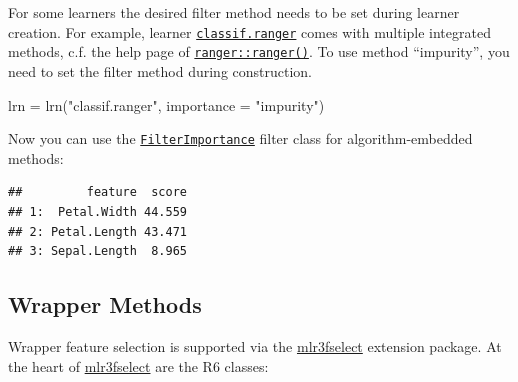 \documentclass[
]{scrbook}
\newenvironment{Shaded}{\begin{snugshade}}{\end{snugshade}}
\newcommand{\AttributeTok}[1]{\textcolor[rgb]{0.77,0.63,0.00}{#1}}
\newcommand{\DecValTok}[1]{\textcolor[rgb]{0.00,0.00,0.81}{#1}}
\newcommand{\FunctionTok}[1]{\textcolor[rgb]{0.00,0.00,0.00}{#1}}
\newcommand{\NormalTok}[1]{#1}
\newcommand{\OtherTok}[1]{\textcolor[rgb]{0.56,0.35,0.01}{#1}}
\newcommand{\SpecialCharTok}[1]{\textcolor[rgb]{0.00,0.00,0.00}{#1}}
\newcommand{\StringTok}[1]{\textcolor[rgb]{0.31,0.60,0.02}{#1}}
\renewenvironment{Shaded} {\begin{snugshade}\small} {\end{snugshade}}
\begin{document}
For some learners the desired filter method needs to be set during learner creation.
For example, learner \href{https://mlr3learners.mlr-org.com/reference/mlr_learners_classif.ranger.html}{\texttt{classif.ranger}} comes with multiple integrated methods, c.f. the help page of \href{https://www.rdocumentation.org/packages/ranger/topics/ranger}{\texttt{ranger::ranger()}}.
To use method ``impurity'', you need to set the filter method during construction.

\begin{Shaded}
\begin{Highlighting}[]
\NormalTok{lrn }\OtherTok{=} \FunctionTok{lrn}\NormalTok{(}\StringTok{"classif.ranger"}\NormalTok{, }\AttributeTok{importance =} \StringTok{"impurity"}\NormalTok{)}
\end{Highlighting}
\end{Shaded}

Now you can use the \href{https://mlr3filters.mlr-org.com/reference/mlr_filters_importance.html}{\texttt{FilterImportance}} filter class for algorithm-embedded methods:

\begin{Shaded}
\end{Shaded}

\begin{verbatim}
##         feature  score
## 1:  Petal.Width 44.559
## 2: Petal.Length 43.471
## 3: Sepal.Length  8.965
\end{verbatim}

\hypertarget{fs-wrapper}{%
\subsection{Wrapper Methods}\label{fs-wrapper}}

Wrapper feature selection is supported via the \href{https://mlr3fselect.mlr-org.com}{mlr3fselect} extension package.
At the heart of \href{https://mlr3fselect.mlr-org.com}{mlr3fselect} are the R6 classes:
\end{document}

